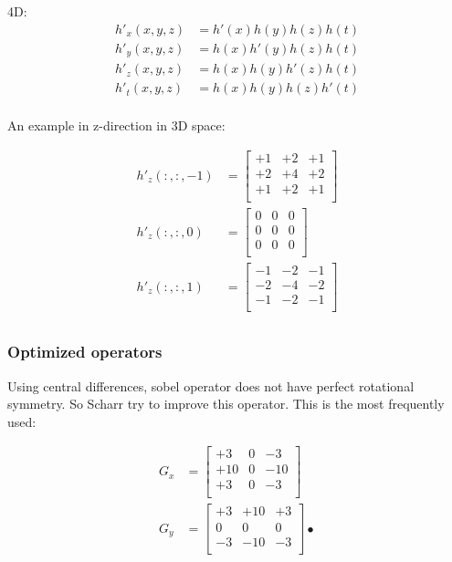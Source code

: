 \documentclass[10pt,twocolumn,letterpaper]{article}
\begin{document}
4D: 
$$
\begin{aligned}
h'_x(x, y, z) & = h'(x)h(y)h(z)h(t) \\
h'_y(x, y, z) & = h(x)h'(y)h(z)h(t) \\
h'_z(x, y, z) & = h(x)h(y)h'(z)h(t) \\
h'_t(x, y, z) & = h(x)h(y)h(z)h'(t) \\
\end{aligned}
$$

An example in z-direction in 3D  space: 

$$
\begin{aligned}
h'_z(:, :, -1) & = 
	\begin{bmatrix}
		+1 & +2 & +1 \\
		+2 & +4 & +2 \\
		+1 & +2 & +1 \\
	\end{bmatrix} \\
h'_z(:, :, 0) & = 
	\begin{bmatrix}
		0 & 0 & 0 \\
		0 & 0 & 0 \\
		0 & 0 & 0 \\
	\end{bmatrix} \\
h'_z(:, :, 1) & =
	\begin{bmatrix}
		-1 & -2 & -1 \\
		-2 & -4 & -2 \\
		-1 & -2 & -1 \\
	\end{bmatrix} \\
\end{aligned}
$$

\subsubsection{Optimized operators}

Using central differences, sobel operator does not have perfect rotational symmetry. 
So Scharr try to improve this operator.\cite{ref6,ref7} This is the most frequently used: 

$$
\begin{aligned}
G_x & = 
	\begin{bmatrix}
		+3 & 0 & -3 \\
		+10 & 0 & -10 \\
		+3 & 0 & -3 \\
	\end{bmatrix} \\
G_y & = 
	\begin{bmatrix}
		+3 & +10 & +3 \\
		0 & 0 & 0 \\
		-3 & -10 & -3 \\
	\end{bmatrix}•
\end{aligned}
$$
\end{document}

